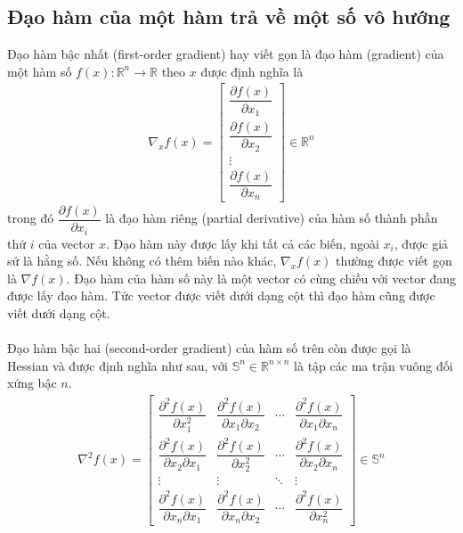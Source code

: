 \documentclass[12pt,a4paper]{report}
\begin{document}
\subsection{Đạo hàm của một hàm trả về một số vô hướng}
Đạo hàm bậc nhất (first-order gradient) hay viết gọn là đạo hàm (gradient) của một hàm số $f(x): \mathbb{R}^n \rightarrow \mathbb{R}$ theo $x$ được định nghĩa là
\begin{eqnarray}
	\nabla_xf(x) = \begin{bmatrix}
	\dfrac{\partial f(x)}{\partial x_1}\\\dfrac{\partial f(x)}{\partial x_2}\\ \vdots \\ \dfrac{\partial f(x)}{\partial x_n}
	\end{bmatrix} \in \mathbb{R}^n
\end{eqnarray} trong đó $\dfrac{\partial f(x)}{\partial x_i}$ là đạo hàm riêng (partial derivative) của hàm số thành phần thứ $i$ của vector $x$. Đạo hàm này được lấy khi tất cả các biến, ngoài $x_i$, được giả sử là hằng số. Nếu không có thêm biến nào khác, $\nabla_xf(x)$ thường được viết gọn là $\nabla f(x)$. Đạo hàm của hàm số này là một vector có cùng chiều với vector đang được lấy đạo hàm. Tức vector được viết dưới dạng cột thì đạo hàm cũng được viết dưới dạng cột. \\\\ Đạo hàm bậc hai (second-order gradient) của hàm số trên còn được gọi là Hessian và được định nghĩa như sau, với $\mathbb{S}^n \in \mathbb{R}^{n \times n}$ là tập các ma trận vuông đối xứng bậc $n$.
\begin{eqnarray}
	\nabla^2f(x) = \begin{bmatrix}
		\dfrac{\partial^2 f(x)}{\partial x^2_1}&\dfrac{\partial^2 f(x)}{\partial x_1\partial x_2}&\cdots&\dfrac{\partial^2 f(x)}{\partial x_1\partial x_n} \\ 	\dfrac{\partial^2 f(x)}{\partial x_2 \partial x_1}&\dfrac{\partial^2 f(x)}{\partial x^2_2}&\cdots&\dfrac{\partial^2 f(x)}{\partial x_2\partial x_n} \\ \vdots & \vdots& \ddots& \vdots \\ 	\dfrac{\partial^2 f(x)}{\partial x_n \partial x_1}&\dfrac{\partial^2 f(x)}{\partial x_n\partial x_2}&\cdots&\dfrac{\partial^2 f(x)}{\partial x^2_n}
	\end{bmatrix} \in \mathbb{S}^n
\end{eqnarray}
\end{document}
